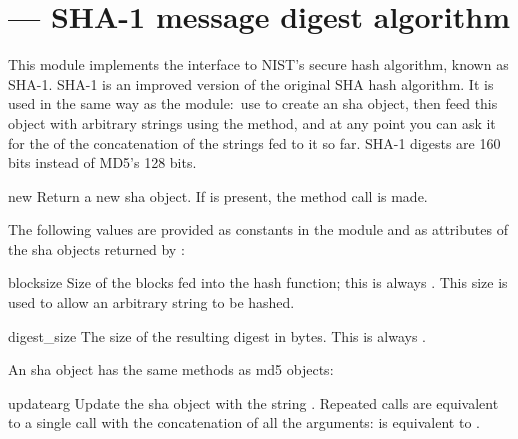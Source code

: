 \section{ ---
         SHA-1 message digest algorithm}




This module implements the interface to NIST's secure hash 
algorithm, known as SHA-1.  SHA-1 is an
improved version of the original SHA hash algorithm.  It is used in
the same way as the  module:\ use 
to create an sha object, then feed this object with arbitrary strings
using the  method, and at any point you can ask it
for the  of the concatenation of the strings fed to it
so far.  SHA-1 digests are 160 bits instead of
MD5's 128 bits.


\begin{funcdesc}{new}{}
  Return a new sha object.  If  is present, the method
  call  is made.
\end{funcdesc}


The following values are provided as constants in the module and as
attributes of the sha objects returned by :

\begin{datadesc}{blocksize}
  Size of the blocks fed into the hash function; this is always
  .  This size is used to allow an arbitrary string to be
  hashed.
\end{datadesc}

\begin{datadesc}{digest_size}
  The size of the resulting digest in bytes.  This is always
  .
\end{datadesc}


An sha object has the same methods as md5 objects:

\begin{methoddesc}[sha]{update}{arg}
Update the sha object with the string .  Repeated calls are
equivalent to a single call with the concatenation of all the
arguments:  is equivalent to
.
\end{methoddesc}

